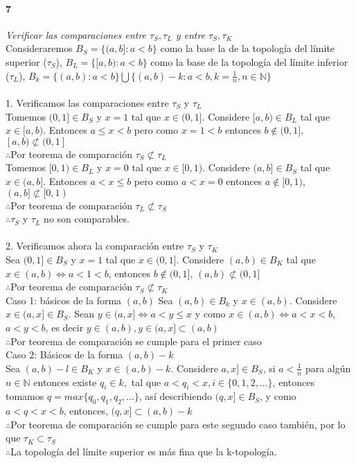 \documentclass[12pt]{article}
\begin{document}
\paragraph{7}
\textit{Verificar las comparaciones entre $\tau_S, \tau_L$ y entre $\tau_S, \tau_K$}
\\Consideraremos $B_S=\{(a,b] : a<b\}$ como la base la de la topología del límite superior ($\tau_S$), $B_L=\{[a,b) : a<b\}$ como la base de la topología del límite inferior ($\tau_L$), $B_k=\{(a,b) : a<b\}\bigcup\{(a,b)-k : a<b, k=\frac{1}{n}, n\in\mathbb{N}\}$\\
\\1. Verificamos las comparaciones entre $\tau_S$ y $\tau_L$
\\Tomemos $(0,1] \in B_S $ y $x=1$ tal que $x \in (0,1]$. Considere $[a,b) \in B_L$ tal que $x\in[a,b)$. Entonces $a\leq x<b$ pero como $x=1<b$ entonces $b \notin (0,1]$, $[a,b)\not\subset(0,1]$
\\\(\therefore\)Por teorema de comparación $\tau_S \not\subset \tau_L$
\\Tomemos $[0,1) \in B_L $ y $x=0$ tal que $x \in [0,1)$. Considere $(a,b] \in B_S$ tal que $x\in(a,b]$. Entonces $a<x\leq b$ pero como $a<x=0$ entonces $a \notin [0,1)$, $(a,b]\not\subset[0,1)$
\\\(\therefore\)Por teorema de comparación $\tau_L \not\subset \tau_S$
\\\(\therefore\)$\tau_S$ y $\tau_L$ no son comparables.\\
\\2. Verificamos ahora la comparación entre $\tau_S$ y $\tau_K$
\\Sea $(0,1] \in B_S$ y $x=1$ tal que $x\in(0,1]$. Considere $(a,b)\in B_K$ tal que $x \in (a,b)\iff a<1<b$, entonces $b\notin(0,1]$, $(a,b)\not\subset(0,1]$
\\\(\therefore\)Por teorema de comparación $\tau_S \not\subset \tau_K$
\\Caso 1: básicos de la forma $(a,b)$
Sea $(a,b)\in B_k$ y $x\in(a,b)$. Considere $x \in (a,x]\in B_S$. Sean $y\in(a,x] \iff a<y \leq x$ y como $x\in(a,b)\iff a<x<b$, $a<y<b$, es decir $y\in(a,b), y\in(a,x]\subset(a,b)$
\\\(\therefore\)Por teorema de comparación se cumple para el primer caso
\\Caso 2: Básicos de la forma $(a,b)-k$
\\Sea $(a,b)-l \in B_K$ y $x\in(a,b)-k$. Considere $a,x]\in B_S$, si $a<\frac{1}{n}$ para algún $n \in \mathbb{N}$ entonces existe $q_i\in k,$ tal que $a<q_i<x, i\in\{0,1,2,...\}$, entonces tomamos $q=max\{q_0,q_1,q_2,...\}$, así describiendo $(q,x]\in B_S$, y como $a<q<x<b$, entonces, $(q,x]\subset(a,b)-k$
\\\(\therefore\)Por teorema de comparación se cumple para este segundo caso también, por lo que $\tau_K \subset \tau_S$
\\\(\therefore\)La topología del límite superior es más fina que la k-topología.
\end{document}
